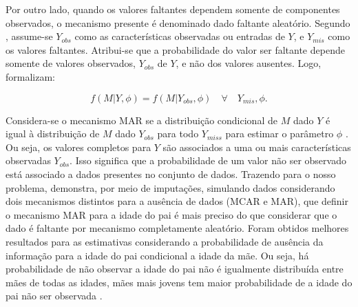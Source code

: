 Por outro lado, quando os valores faltantes dependem somente de componentes observados, o mecanismo presente é denominado dado faltante aleatório. Segundo , assume-se ${Y_{obs}}$ como as características observadas ou entradas de $Y$, e ${Y_{mis}}$ como os valores faltantes. Atribui-se que a probabilidade do valor ser faltante depende somente de valores observados, ${Y_{obs}}$ de $Y$, e não dos valores ausentes. Logo,  formalizam:

\begin{equation} \label{mar_equ}
f(M|Y, \phi)= f(M|{Y_{obs}}, \phi) \quad   \forall \quad Y_{mis},\phi. 
\end{equation}

Considera-se o mecanismo MAR se a distribuição condicional de $M$ dado $Y$ é igual à distribuição de $M$ dado ${Y_{obs}}$ para todo ${Y_{miss}}$ para estimar o parâmetro $\phi$ \cite{rubin1976inference}. Ou seja, os valores completos para $Y$ são associados a uma ou mais características observadas ${Y_{obs}}$. Isso significa que a probabilidade de um valor não ser observado está associado a dados presentes no conjunto de dados. Trazendo para o nosso problema,  demonstra, por meio de imputações, simulando dados considerando dois mecanismos distintos para a ausência de dados (MCAR e MAR), que definir o mecanismo MAR para a idade do pai é mais preciso do que considerar que o dado é faltante por mecanismo completamente aleatório. Foram obtidos melhores resultados para as estimativas considerando a probabilidade de ausência da informação para a idade do pai condicional a idade da mãe. Ou seja, há probabilidade de não observar a idade do pai não é igualmente distribuída entre mães de todas as idades, mães mais jovens tem maior probabilidade de a idade do pai não ser observada \cite{dudel2019estimating}.        



